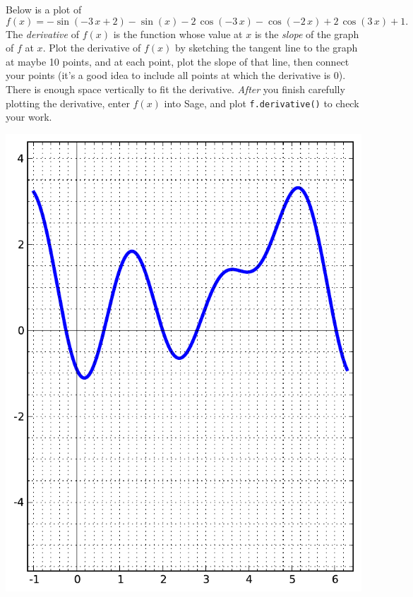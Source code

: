 Below is a plot of $$f(x)=-\sin\left(-3 \, x + 2\right) - \sin\left(x\right) - 2 \, \cos\left(-3 \, x\right) - \cos\left(-2 \, x\right) + 2 \, \cos\left(3 \, x\right) + 1.$$  The {\em \color{red}derivative} of $f(x)$ is the function whose value at $x$ is the {\em slope} of the graph of $f$ at $x$.  Plot the derivative of $f(x)$ by sketching the tangent line to the graph at maybe 10 points, and at each point, plot the slope of that line, then connect your points (it's a good idea to include all points at which the derivative is 0).  There is enough space vertically to fit the derivative.  {\em After} you finish carefully plotting the derivative, enter $f(x)$ into Sage, and plot {\color{blue}\verb|f.derivative()|} to check your work.
\begin{center}\includegraphics{functions/87.pdf}\end{center}\newpage

